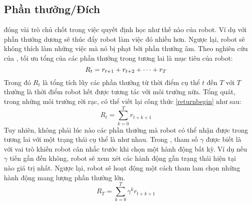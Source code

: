 \subsection{Phần thưởng/Đích}
đóng vài trò chủ chốt trong việc quyết định học như thế nào của robot. Ví dụ với phần thưởng dương sẽ thúc đẩy robot làm việc đó nhiều hơn. Ngược lại, robot sẽ không thích làm những việc mà nó bị phạt bởi phần thưởng âm. Theo nghiên cứu của \cite{RLSuttonBook}, tối ưu tổng của các phần thưởng trong tương lai là mục tiêu của robot:\\
\begin{equation}\label{returnbegin}
    R_t = r_{t+1} + r_{t+2} + \dots +r_T\\
\end{equation}
Trong đó $R_t$ là tổng tích lũy các phần thưởng từ thời điểm cụ thể $t$ đến $T$ với $ T$ thường là thời điểm robot hết được tương tác với môi trường nữa. Tổng quát, trong những môi trường rời rạc, có thể viết lại công thức \ref{returnbegin} như sau:
\begin{equation}\label{returnStochastic}
    R_t = \sum^T_{k=0}r_{t+k+1}
\end{equation}
Tuy nhiên, không phải lúc nào các phần thưởng mà robot có thể nhận được trong tương lai với một trạng thái cụ thể là như nhau. Trong \cite{RLSuttonBook}, tham số $\gamma$ được biết là  với vai trò khiến robot cân nhắc trước khi chọn một hành động bất kỳ. Ví dụ nếu $\gamma$ tiến gần đến không, robot sẽ xem xét các hành động gần trạng thái hiện tại nào giá trị nhất. Ngược lại, robot sẽ hoạt động một cách tham lam chọn những hành động mang lượng phần thưởng lớn. 
\begin{equation}\label{finalReturn}
    R_T = \sum^T_{k=0}\gamma^kr_{t+k+1}
\end{equation}
